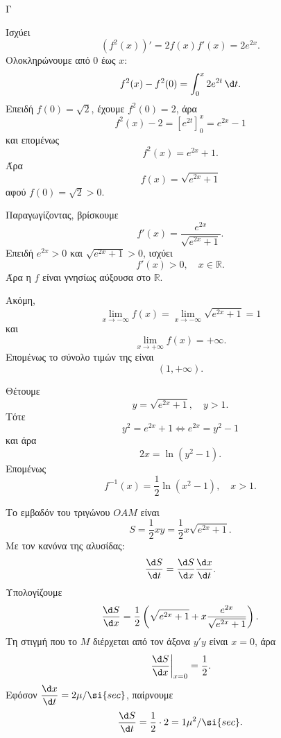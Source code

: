 \begin{thema}{Γ}
\begin{erwthma}
\item Ισχύει
\[
\left(f^2(x)\right)'=2f(x)f'(x)=2e^{2x}.
\]
Ολοκληρώνουμε από $0$ έως $x$:
\[
f^2(x)-f^2(0)=\int_0^x 2e^{2t}\,\d t.
\]
Επειδή $f(0)=\sqrt{2}$, έχουμε $f^2(0)=2$, άρα
\[
f^2(x)-2=\left[e^{2t}\right]_0^x=e^{2x}-1
\]
και επομένως
\[
f^2(x)=e^{2x}+1.
\]
Άρα
\[
f(x)=\sqrt{e^{2x}+1}
\]
αφού $f(0)=\sqrt{2}>0$.

\item Παραγωγίζοντας, βρίσκουμε
\[
f'(x)=\frac{e^{2x}}{\sqrt{e^{2x}+1}}.
\]
Επειδή $e^{2x}>0$ και $\sqrt{e^{2x}+1}>0$, ισχύει
\[
f'(x)>0,\quad x\in \mathbb{R}.
\]
Άρα η $f$ είναι γνησίως αύξουσα στο $\mathbb{R}$.

Ακόμη,
\[
\lim_{x\to -\infty}f(x)=\lim_{x\to -\infty}\sqrt{e^{2x}+1}=1
\]
και
\[
\lim_{x\to +\infty}f(x)=+\infty.
\]
Επομένως το σύνολο τιμών της είναι
\[
(1,+\infty).
\]

\item Θέτουμε
\[
y=\sqrt{e^{2x}+1}, \quad y>1.
\]
Τότε
\[
y^2=e^{2x}+1 \Leftrightarrow e^{2x}=y^2-1
\]
και άρα
\[
2x=\ln(y^2-1).
\]
Επομένως
\[
f^{-1}(x)=\frac{1}{2}\ln(x^2-1), \quad x>1.
\]

\item Το εμβαδόν του τριγώνου $OAM$ είναι
\[
S=\frac{1}{2}xy=\frac{1}{2}x\sqrt{e^{2x}+1}.
\]
Με τον κανόνα της αλυσίδας:
\[
\frac{\d S}{\d t}=\frac{\d S}{\d x}\frac{\d x}{\d t}.
\]
Υπολογίζουμε
\[
\frac{\d S}{\d x}
=
\frac{1}{2}\left(\sqrt{e^{2x}+1}+x\frac{e^{2x}}{\sqrt{e^{2x}+1}}\right).
\]
Τη στιγμή που το $M$ διέρχεται από τον άξονα $y'y$ είναι $x=0$, άρα
\[
\left.\frac{\d S}{\d x}\right|_{x=0}
=
\frac{1}{2}.
\]
Εφόσον $\dfrac{\d x}{\d t}=2\mu/\si{sec}$, παίρνουμε
\[
\frac{\d S}{\d t}=\frac{1}{2}\cdot 2=1\mu^2/\si{sec}.
\]
\end{erwthma}
\end{thema}
